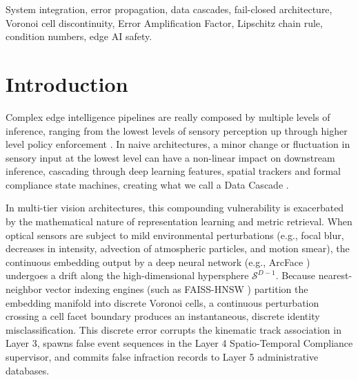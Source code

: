 \documentclass[conference]{IEEEtran}
\begin{document}
\begin{IEEEkeywords}
System integration, error propagation, data cascades, fail-closed architecture, Voronoi cell discontinuity, Error Amplification Factor, Lipschitz chain rule, condition numbers, edge AI safety.
\end{IEEEkeywords}

\section{Introduction}
Complex edge intelligence pipelines are really composed by multiple levels of inference, ranging from the lowest levels of sensory perception up through higher level policy enforcement \cite{sculley2015hidden, sambasivan2021everyone, leveson1995safeware}. In naive architectures, a minor change or fluctuation in sensory input at the lowest level can have a non-linear impact on downstream inference, cascading through deep learning features, spatial trackers and formal compliance state machines, creating what we call a Data Cascade \cite{sambasivan2021everyone, kumar2026scholar23}. 

In multi-tier vision architectures, this compounding vulnerability is exacerbated by the mathematical nature of representation learning and metric retrieval. When optical sensors are subject to mild environmental perturbations (e.g., focal blur, decreases in intensity, advection of atmospheric particles, and motion smear), the continuous embedding output by a deep neural network (e.g., ArcFace \cite{deng2019arcface}) undergoes a drift along the high-dimensional hypersphere $\mathcal{S}^{D-1}$. Because nearest-neighbor vector indexing engines (such as FAISS-HNSW \cite{malkov2018efficient}) partition the embedding manifold into discrete Voronoi cells, a continuous perturbation crossing a cell facet boundary produces an instantaneous, discrete identity misclassification. This discrete error corrupts the kinematic track association in Layer 3, spawns false event sequences in the Layer 4 Spatio-Temporal Compliance supervisor, and commits false infraction records to Layer 5 administrative databases.
\end{document}
